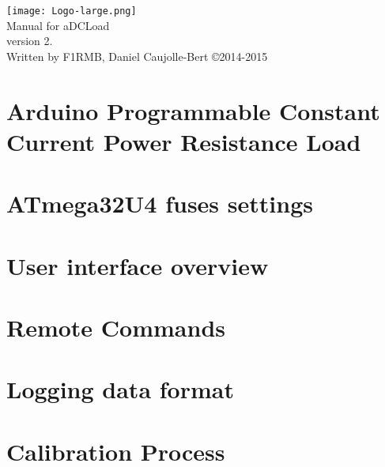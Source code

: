 \documentclass[twoside]{book}
\newcommand{\clearemptydoublepage}{%
  \newpage{\pagestyle{empty}\cleardoublepage}%
}
\begin{document}
\hypersetup{pageanchor=false}
\begin{titlepage}
\vspace*{7cm}
\begin{center}%
{\texttt{[image: Logo-large.png]}}\\
\vspace*{0.5cm}
{\Large Manual for a\-D\-C\-Load \\[1ex]\large version 2. }\\
\vspace*{1cm}
{\large Written by F1RMB, Daniel Caujolle-Bert \copyright 2014-2015 }\\
\vspace*{1cm}
\end{center}
\end{titlepage}
\clearemptydoublepage
\tableofcontents
\clearemptydoublepage
{}
\hypersetup{pageanchor=true}

\chapter{Arduino Programmable Constant Current Power Resistance Load}
\label{md__home_daniel_src__arduino__arduino_a_d_c_load__r_e_a_d_m_e}
\hypertarget{md__home_daniel_src__arduino__arduino_a_d_c_load__r_e_a_d_m_e}{}

\chapter{A\-Tmega32\-U4 fuses settings}
\label{fuses}
\hypertarget{fuses}{}

\chapter{User interface overview}
\label{gui}
\hypertarget{gui}{}

\chapter{Remote Commands}
\label{remote}
\hypertarget{remote}{}

\chapter{Logging data format}
\label{logging}
\hypertarget{logging}{}

\chapter{Calibration Process}
\label{calibration}
\hypertarget{calibration}{}

\end{document}
